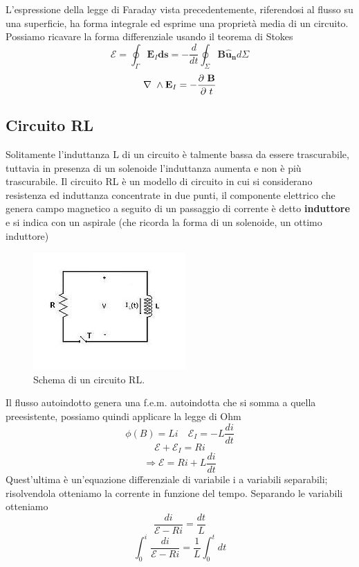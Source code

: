 \documentclass[10pt,a4paper]{article}
\def\d{\ensuremath\partial}
\def\d{\ensuremath\partial\ }
\def\n{\ensuremath\nabla}
\def\n{\ensuremath\nabla\ }
\begin{document}
L'espressione della legge di Faraday vista precedentemente, riferendosi al flusso su una superficie, ha forma integrale ed esprime una proprietà media di un circuito. Possiamo ricavare la forma differenziale usando il teorema di Stokes
\[\mathcal{E} = \oint_{\Gamma}\mathbf{E}_I \mathbf{ds} = -\frac{d}{dt}\oint_{\Sigma}\mathbf{B\mathbf{\hat{u}_n}}d\Sigma\]
\begin{align}\label{eq:Faraday_differenziale}
	\n\wedge\mathbf{E}_I = -\frac{\d \mathbf{B}}{\d t}
\end{align}
\subsection{Circuito RL}
Solitamente l'induttanza L di un circuito è talmente bassa da essere trascurabile, tuttavia in presenza di un solenoide l'induttanza aumenta e non è più trascurabile. Il circuito RL è un modello di circuito in cui si considerano resistenza ed induttanza concentrate in due punti, il componente elettrico che genera campo magnetico a seguito di un passaggio di corrente è detto \textbf{induttore} e si indica con un aspirale (che ricorda la forma di un solenoide, un ottimo induttore)
\begin{figure}[h!]
	\centering
	\includegraphics[width=0.6\linewidth]{images/circuito_RL}
	\caption{Schema di un circuito RL.}
	\label{fig:circuitorl}
\end{figure}
\FloatBarrier
Il flusso autoindotto genera una f.e.m. autoindotta che si somma a quella preesistente, possiamo quindi applicare la legge di Ohm 
\[\phi(B) = L i \quad \mathcal{E}_I = -L\frac{d i}{dt}\]
\[\mathcal{E} + \mathcal{E}_I = Ri \]
\[\Rightarrow \mathcal{E} = Ri+L\frac{di}{dt}\]
Quest'ultima è un'equazione differenziale di variabile i a variabili separabili; risolvendola otteniamo la corrente in funzione del tempo. Separando le variabili otteniamo
\[\frac{di}{\mathcal{E}-Ri} = \frac{dt}{L}\]
\[\int_{0}^{i}\frac{di}{\mathcal{E}-Ri} = \frac{1}{L}\int_{0}^{t}dt\]
\end{document}
